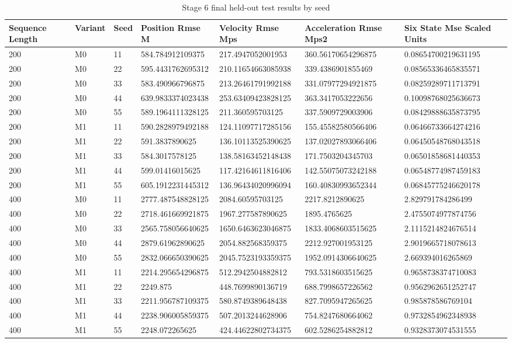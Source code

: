 \begin{table}[t]
\centering
\caption{Stage 6 final held-out test results by seed}
\label{tab:stage6}
\scriptsize
\begin{tabular}{lllllll}
\hline
Sequence Length & Variant & Seed & Position Rmse M & Velocity Rmse Mps & Acceleration Rmse Mps2 & Six State Mse Scaled Units \\
\hline
200 & M0 & 11 & 584.784912109375 & 217.4947052001953 & 360.56170654296875 & 0.08654700219631195 \\
200 & M0 & 22 & 595.4431762695312 & 210.11654663085938 & 339.4386901855469 & 0.08565336465835571 \\
200 & M0 & 33 & 583.490966796875 & 213.26461791992188 & 331.07977294921875 & 0.08259289711713791 \\
200 & M0 & 44 & 639.9833374023438 & 253.63409423828125 & 363.3417053222656 & 0.10098768025636673 \\
200 & M0 & 55 & 589.1964111328125 & 211.360595703125 & 337.5909729003906 & 0.08429888635873795 \\
200 & M1 & 11 & 590.2828979492188 & 124.11097717285156 & 155.45582580566406 & 0.06466733664274216 \\
200 & M1 & 22 & 591.3837890625 & 136.10113525390625 & 137.02027893066406 & 0.06450548768043518 \\
200 & M1 & 33 & 584.3017578125 & 138.58163452148438 & 171.7503204345703 & 0.06501858681440353 \\
200 & M1 & 44 & 599.01416015625 & 117.42164611816406 & 142.55075073242188 & 0.06548774987459183 \\
200 & M1 & 55 & 605.1912231445312 & 136.96434020996094 & 160.40830993652344 & 0.06845775246620178 \\
400 & M0 & 11 & 2777.487548828125 & 2084.60595703125 & 2217.8212890625 & 2.829791784286499 \\
400 & M0 & 22 & 2718.461669921875 & 1967.277587890625 & 1895.4765625 & 2.4755074977874756 \\
400 & M0 & 33 & 2565.758056640625 & 1650.6463623046875 & 1833.4068603515625 & 2.1115214824676514 \\
400 & M0 & 44 & 2879.61962890625 & 2054.882568359375 & 2212.927001953125 & 2.9019665718078613 \\
400 & M0 & 55 & 2832.066650390625 & 2045.7523193359375 & 1952.0914306640625 & 2.669394016265869 \\
400 & M1 & 11 & 2214.295654296875 & 512.2942504882812 & 793.5318603515625 & 0.9658738374710083 \\
400 & M1 & 22 & 2249.875 & 448.7699890136719 & 688.7998657226562 & 0.9562962651252747 \\
400 & M1 & 33 & 2211.956787109375 & 580.8749389648438 & 827.7095947265625 & 0.985878586769104 \\
400 & M1 & 44 & 2238.906005859375 & 507.2013244628906 & 754.8247680664062 & 0.9732854962348938 \\
400 & M1 & 55 & 2248.072265625 & 424.44622802734375 & 602.5286254882812 & 0.9328373074531555 \\
\hline
\end{tabular}
\end{table}
